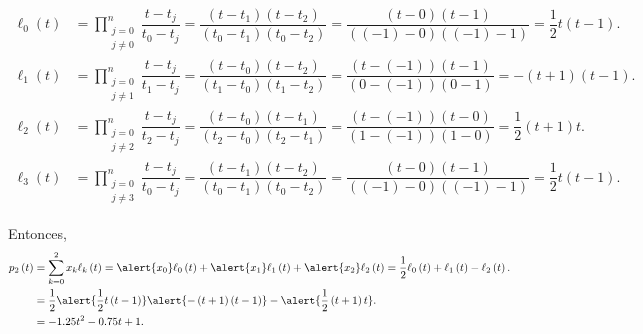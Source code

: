 \begin{frame}
	\begin{solution}
		\begin{align*}
			\ell_{0}\left(t\right) & =
			\prod\limits_{\substack{j=0        \\j\neq 0}}^{n}
			\dfrac{t-t_{j}}{t_{0}-t_{j}}=
			\dfrac{\left(t-t_{1}\right)\left(t-t_{2}\right)}{\left(t_{0}-t_{1}\right)\left(t_{0}-t_{2}\right)}=
			\dfrac{\left(t-0\right)\left(t-1\right)}{\left(\left(-1\right)-0\right)\left(\left(-1\right)-1\right)}=
			\dfrac{1}{2}t\left(t-1\right).     \\
			\ell_{1}\left(t\right) & =
			\prod\limits_{\substack{j=0        \\j\neq 1}}^{n}
			\dfrac{t-t_{j}}{t_{1}-t_{j}}=
			\dfrac{\left(t-t_{0}\right)\left(t-t_{2}\right)}{\left(t_{1}-t_{0}\right)\left(t_{1}-t_{2}\right)}=
			\dfrac{\left(t-\left(-1\right)\right)\left(t-1\right)}{\left(0-\left(-1\right)\right)\left(0-1\right)}=
			-\left(t+1\right)\left(t-1\right). \\
			\ell_{2}\left(t\right) & =
			\prod\limits_{\substack{j=0        \\j\neq 2}}^{n}
			\dfrac{t-t_{j}}{t_{2}-t_{j}}=
			\dfrac{\left(t-t_{0}\right)\left(t-t_{1}\right)}{\left(t_{2}-t_{0}\right)\left(t_{2}-t_{1}\right)}=
			\dfrac{\left(t-\left(-1\right)\right)\left(t-0\right)}{\left(1-\left(-1\right)\right)\left(1-0\right)}=
			\dfrac{1}{2}\left(t+1\right)t.   \\
            \ell_{3}\left(t\right) & =
			\prod\limits_{\substack{j=0        \\j\neq 3}}^{n}
			\dfrac{t-t_{j}}{t_{0}-t_{j}}=
			\dfrac{\left(t-t_{1}\right)\left(t-t_{2}\right)}{\left(t_{0}-t_{1}\right)\left(t_{0}-t_{2}\right)}=
			\dfrac{\left(t-0\right)\left(t-1\right)}{\left(\left(-1\right)-0\right)\left(\left(-1\right)-1\right)}=
			\dfrac{1}{2}t\left(t-1\right).     
		\end{align*}

		Entonces,
		\begin{align*}
			p_{2}\left(t\right) & =
			\sum\limits_{k=0}^{2}
			x_{k}
			\ell_{k}\left(t\right)=
			\alert{x_{0}}\ell_{0}\left(t\right)+
			\alert{x_{1}}\ell_{1}\left(t\right)+
			\alert{x_{2}}\ell_{2}\left(t\right)=
			\dfrac{1}{2}\ell_{0}\left(t\right)+
			\ell_{1}\left(t\right)-
			\ell_{2}\left(t\right).               \\
			                    & =
			\dfrac{1}{2}\alert{\dfrac{1}{2}t\left(t-1\right)}
			\alert{-\left(t+1\right)\left(t-1\right)}-
			\alert{\dfrac{1}{2}\left(t+1\right)t}. \\
			                    & =
			-1.25t^{2}-0.75t+1.
		\end{align*}
	\end{solution}
\end{frame}

